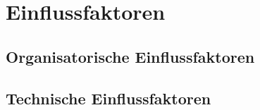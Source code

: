 \chapter{Einflussfaktoren}
\label{ch:Einflussfaktoren}
\section{Organisatorische Einflussfaktoren}
\section{Technische Einflussfaktoren}